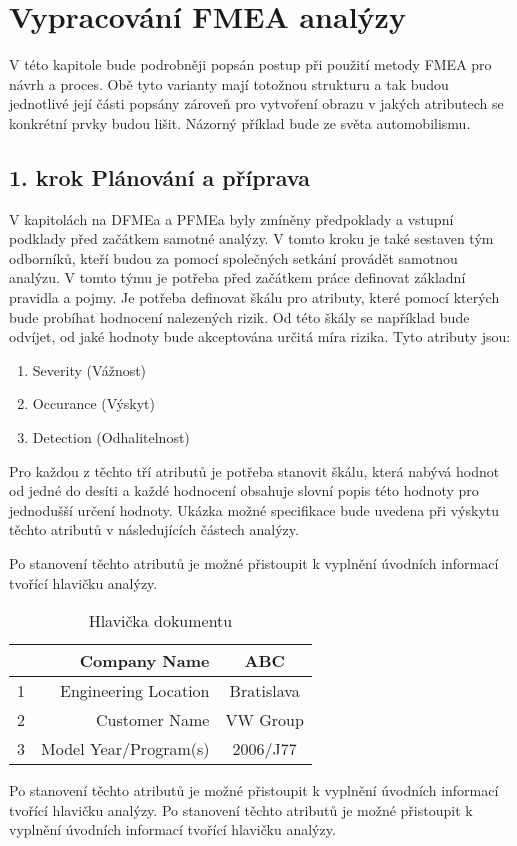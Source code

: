 \chapter{Vypracování FMEA analýzy}
\label{sec:FMEA_postup}
V této kapitole bude podrobněji popsán postup při použití metody FMEA pro návrh a proces. Obě tyto varianty mají totožnou strukturu a tak budou jednotlivé její části popsány zároveň pro vytvoření obrazu v jakých atributech se konkrétní prvky budou lišit. Názorný příklad bude ze světa automobilismu. 

\section{1. krok Plánování a příprava}
V kapitolách na DFMEa a PFMEa byly zmíněny předpoklady a vstupní podklady před začátkem samotné analýzy. V tomto kroku je také sestaven tým odborníků, kteří budou za pomocí společných setkání provádět samotnou analýzu. V tomto týmu je potřeba před začátkem práce definovat základní pravidla a pojmy. Je potřeba definovat škálu pro atributy, které pomocí kterých bude probíhat hodnocení nalezených rizik. Od této škály se například bude odvíjet, od jaké hodnoty bude akceptována určitá míra rizika. Tyto atributy jsou: 

\begin{enumerate}
	\item Severity (Vážnost)
	\item Occurance (Výskyt)
	\item Detection (Odhalitelnost)
\end{enumerate}

Pro každou z těchto tří atributů je potřeba stanovit škálu, která nabývá hodnot od jedné do desíti a každé hodnocení obsahuje slovní popis této hodnoty pro jednodušší určení hodnoty. Ukázka možné specifikace bude uvedena při výskytu těchto atributů v následujících částech analýzy.  

Po stanovení těchto atributů je možné přistoupit k vyplnění úvodních informací tvořící hlavičku analýzy. 

\begin{center}
\begin{table}
	\centering
	\caption{Hlavička dokumentu}
	\label{tab:Head1}
        \begin{tabular}{|c | r | c |} 
         \hline
          & Company Name & ABC  \\ [0.5ex] 
         \hline
         1 & Engineering Location & Bratislava  \\ [0.5ex] 
         \hline
         2 & Customer Name & VW Group  \\ [0.5ex] 
         \hline
         3 & Model Year/Program(s) & 2006/J77 \\ [0.5ex] 
         \hline
        \end{tabular}
    \end{table}
\end{center}

Po stanovení těchto atributů je možné přistoupit k vyplnění úvodních informací tvořící hlavičku analýzy. Po stanovení těchto atributů je možné přistoupit k vyplnění úvodních informací tvořící hlavičku analýzy. 
